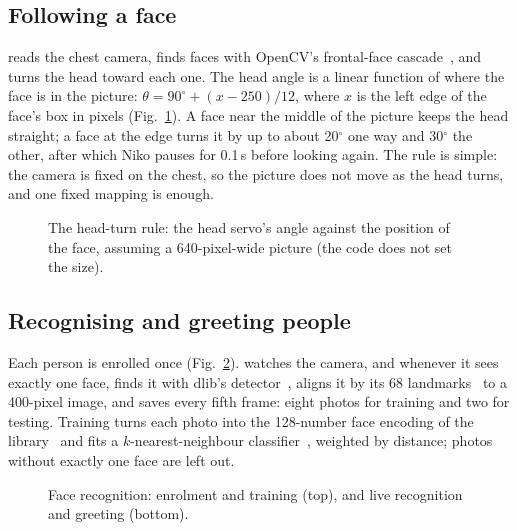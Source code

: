 \documentclass[11pt]{article}
\begin{document}
\subsection{Following a face}

 reads the chest camera, finds faces with OpenCV's frontal-face cascade~\cite{viola2001rapid,bradski2000opencv}, and turns the head toward each one. The head angle is a linear function of where the face is in the picture: $\theta = 90^\circ + (x - 250)/12$, where $x$ is the left edge of the face's box in pixels (Fig.~\ref{fig:follow}). A face near the middle of the picture keeps the head straight; a face at the edge turns it by up to about 20$^\circ$ one way and 30$^\circ$ the other, after which Niko pauses for 0.1\,s before looking again. The rule is simple: the camera is fixed on the chest, so the picture does not move as the head turns, and one fixed mapping is enough.

\begin{figure}[htbp]
  \centering
  \caption{The head-turn rule: the head servo's angle against the position of the face, assuming a 640-pixel-wide picture (the code does not set the size).}
  \label{fig:follow}
\end{figure}

\subsection{Recognising and greeting people}

Each person is enrolled once (Fig.~\ref{fig:faces}).  watches the camera, and whenever it sees exactly one face, finds it with dlib's detector~\cite{king2009dlib}, aligns it by its 68 landmarks~\cite{kazemi2014one} to a 400-pixel image, and saves every fifth frame: eight photos for training and two for testing. Training turns each photo into the 128-number face encoding of the  library~\cite{facerecognition} and fits a $k$-nearest-neighbour classifier~\cite{cover1967nearest,pedregosa2011sklearn}, weighted by distance; photos without exactly one face are left out.

\begin{figure}[htbp]
  \centering
  \caption{Face recognition: enrolment and training (top), and live recognition and greeting (bottom).}
  \label{fig:faces}
\end{figure}
\end{document}
